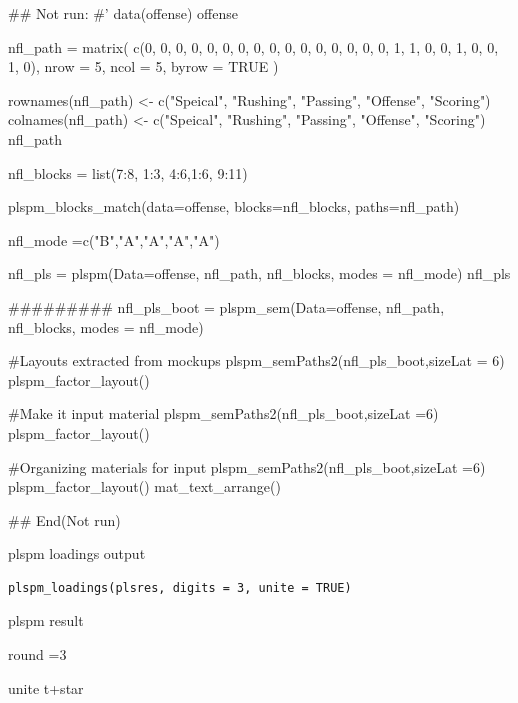 \documentclass[a4paper]{book}
\begin{document}
\begin{Examples}
\begin{ExampleCode}


## Not run: 
#'
data(offense)
offense %

nfl_path = matrix(
  c(0, 0, 0, 0, 0,
    0, 0, 0, 0, 0,
    0, 0, 0, 0, 0,
    0, 1, 1, 0, 0,
    1, 0, 0, 1, 0),
  nrow = 5, ncol = 5, byrow = TRUE )

rownames(nfl_path) <- c("Speical", "Rushing", "Passing", "Offense", "Scoring")
colnames(nfl_path) <- c("Speical", "Rushing", "Passing", "Offense", "Scoring")
nfl_path

nfl_blocks = list(7:8, 1:3, 4:6,1:6, 9:11)

plspm_blocks_match(data=offense, blocks=nfl_blocks,
                   paths=nfl_path)

nfl_mode =c("B","A","A","A","A")

nfl_pls = plspm(Data=offense, nfl_path, nfl_blocks, modes = nfl_mode)
nfl_pls%

#########
nfl_pls_boot = plspm_sem(Data=offense, nfl_path, nfl_blocks, modes = nfl_mode)

#Layouts extracted from mockups
plspm_semPaths2(nfl_pls_boot,sizeLat = 6)%
  plspm_factor_layout()

#Make it input material
plspm_semPaths2(nfl_pls_boot,sizeLat =6)%
  plspm_factor_layout() %

#Organizing materials for input
plspm_semPaths2(nfl_pls_boot,sizeLat =6)%
  plspm_factor_layout() %
  mat_text_arrange()

## End(Not run)

\end{ExampleCode}
\end{Examples}
%
\begin{Description}
plspm loadings output
\end{Description}
%
\begin{Usage}
\begin{verbatim}
plspm_loadings(plsres, digits = 3, unite = TRUE)
\end{verbatim}
\end{Usage}
%
\begin{Arguments}
\begin{ldescription}
\item[\code{plsres}] plspm result

\item[\code{digits}] round =3

\item[\code{unite}] unite t+star
\end{ldescription}
\end{Arguments}
\end{document}
